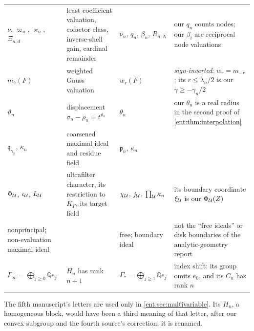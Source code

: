 \documentclass[11pt]{article}
\theoremstyle{plain}
\theoremstyle{plain}
\theoremstyle{plain}
\theoremstyle{definition}
\theoremstyle{definition}
\theoremstyle{definition}
\theoremstyle{definition}
\theoremstyle{remark}
\newcommand{\Q}{\mathbb Q}\newcommand{\Z}{\mathbb Z}\newcommand{\N}{\mathbb N}
\newcommand{\K}{K_\Gamma}\newcommand{\KD}{K_\Delta}
\begin{document}
\begin{center}
\begin{tabularx}{\textwidth}{@{}P{0.2\textwidth}P{0.3\textwidth}P{0.17\textwidth}Y@{}}
$\nu$, $\varpi_n$, $\varkappa_n$, $\Xi_{n,d}$ & least coefficient valuation,
cofactor class, inverse-shell gain, cardinal remainder & $\nu_n$, $q_n$,
$\beta_n$, $R_{n,N}$ & our $q_n$ counts nodes; our $\beta_i$ are reciprocal
node valuations\\[0.3em]
$m_\gamma(F)$ & weighted Gauss valuation & $w_r(F)$ & \emph{sign-inverted}:
$w_r=m_{-r}$; its $r\le\lambda_n/2$ is our $\gamma\ge-\gamma_n/2$\\[0.3em]
$\vartheta_n$ & displacement $\sigma_n-\rho_n=t^{\vartheta_n}$ & $\theta_n$
& our $\theta_n$ is a real radius in the second proof of
\cref{ent:thm:interpolation}\\[0.3em]
$\mathfrak q_{\gamma_n}$, $\kappa_n$ & coarsened maximal ideal and residue
field & $\mathfrak p_n$, $\kappa_n$ & \\[0.3em]
$\Phi_\mathcal U$, $\iota_\mathcal U$, $L_\mathcal U$ & ultrafilter character, its
restriction to $\K$, its target field & $\chi_\mathcal U$, $j_\mathcal U$,
$\prod_\mathcal U\kappa_n$ & its boundary coordinate $\xi_\mathcal U$ is our
$\Phi_\mathcal U(Z)$\\[0.3em]
nonprincipal; non-evaluation maximal ideal & & free; boundary ideal & not
the ``free ideals'' or disk boundaries of the analytic-geometry
report\\[0.3em]
$\Gamma_\infty=\bigoplus_{j\ge0}\Q e_j$ & $H_n$ has rank $n+1$ &
$\Gamma_*=\bigoplus_{j\ge1}\Q e_j$ & index shift: its group omits $e_0$, and
its $C_n$ has rank $n$\\
\bottomrule
\end{tabularx}
\end{center}

The fifth manuscript's letters are used only in \cref{ent:sec:multivariable}.
Its $H_n$, a homogeneous block, would have been a third meaning of that
letter, after our convex subgroup and the fourth source's correction; it is
renamed.
\end{document}
